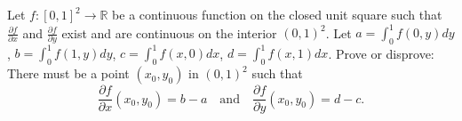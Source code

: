 Let $f:[0,1]^2\to\mathbb{R}$ be a continuous function on the closed unit square such that $\frac{\partial f}{\partial x}$ and $\frac{\partial f}{\partial y}$ exist and are continuous on the interior $(0,1)^2$. Let $a=\int_0^1f(0,y)dy$, $b=\int_0^1f(1,y)dy$, $c=\int_0^1f(x,0)dx$, $d=\int_0^1f(x,1)dx$. Prove or disprove: There must be a point $(x_0,y_0)$ in $(0,1)^2$ such that \[\frac{\partial f}{\partial x}(x_0,y_0)=b-a\quad\text{and}\quad\frac{\partial f}{\partial y}(x_0,y_0)=d-c.\]